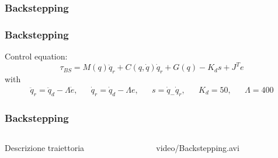 \subsubsection{Backstepping}
\begin{frame}
\frametitle{Backstepping}
Control equation:
\begin{equation}
	\tau_{BS} = M(q)\ddot{q}_r + C(q,\dot{q})\dot{q}_r + G(q) - K_ds + J^Te
\end{equation}
with
\begin{align*}
\ddot{q}_r=\ddot{q}_d - \Lambda\dot{e}, && \dot{q}_r=\dot{q}_d - \Lambda e, && s=\dot{q}_ - \dot{q}_r, && K_d=50, && \Lambda=400
\end{align*}
\end{frame}
%
\begin{frame}
\frametitle{Backstepping}
%
\begin{columns}
\begin{column}{0.4\textwidth}
	Descrizione traiettoria
\end{column}
\begin{column}{0.6\textwidth}
	\begin{center}
		{video/Backstepping.avi}
	\end{center}
\end{column}
\end{columns}
\end{frame}
%
